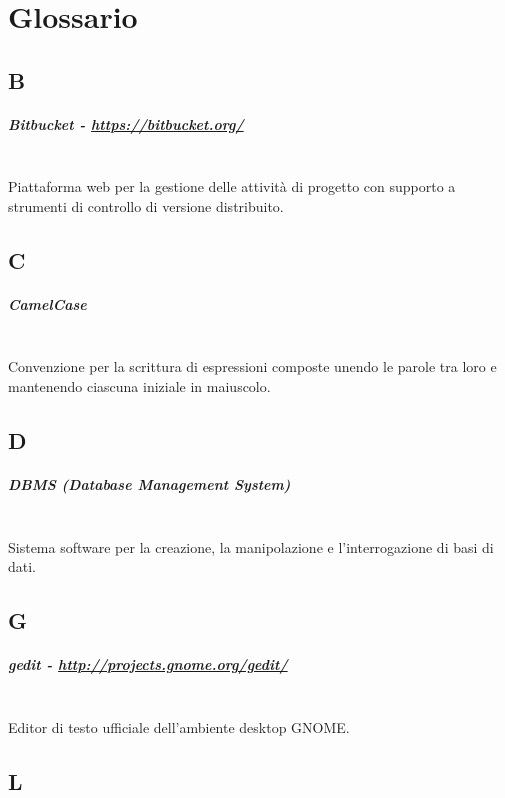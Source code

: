 \chapter{Glossario}
\label{ch:tesi:appendice:glossario}

\section*{B}
\paragraph{Bitbucket - \url{https://bitbucket.org/}} \hfill \\
Piattaforma web per la gestione delle attività di progetto con supporto a strumenti di controllo di versione distribuito.

\section*{C}
\paragraph{CamelCase} \hfill \\
Convenzione per la scrittura di espressioni composte unendo le parole tra loro e mantenendo ciascuna iniziale in maiuscolo.

\section*{D}
\paragraph{DBMS (Database Management System)} \hfill \\
Sistema software per la creazione, la manipolazione e l'interrogazione di basi di dati.

\section*{G}
\paragraph{gedit - \url{http://projects.gnome.org/gedit/}} \hfill \\
Editor di testo ufficiale dell'ambiente desktop GNOME.

\section*{L}
